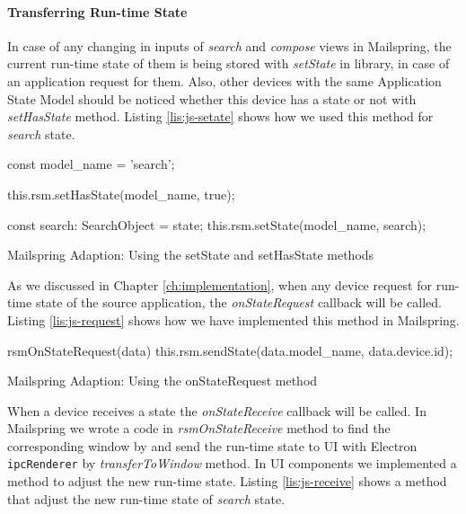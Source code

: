 \paragraph{Transferring Run-time State}
In case of any changing in inputs of \textit{search} and \textit{compose} views in Mailspring, the current run-time state of them is being stored with \textit{setState} in library, in case of an application request for them. Also, other devices with the same Application State Model should be noticed whether this device has a state or not with \textit{setHasState} method. Listing \ref{lis:js-setate} shows how we used this method for \textit{search} state.

\FloatBarrier
\begin{code}
\begin{js2}
const model_name = 'search';

this.rsm.setHasState(model_name, true);

const search: SearchObject = state;
this.rsm.setState(model_name, search);
\end{js2}
\caption{Mailspring Adaption: Using the setState and setHasState methods}
\label{lis:js-setate}
\end{code}
\FloatBarrier


As we discussed in Chapter \ref{ch:implementation}, when any device request for run-time state of the source application, the \textit{onStateRequest} callback will be called. Listing \ref{lis:js-request} shows how we have implemented this method in Mailspring. 
  
\FloatBarrier
\begin{code}
\begin{js2}
rsmOnStateRequest(data) {
   this.rsm.sendState(data.model_name, data.device.id);
}
\end{js2}
\caption{Mailspring Adaption: Using the onStateRequest method}
\label{lis:js-request}
\end{code}
\FloatBarrier

When a device receives a state the \textit{onStateReceive} callback will be called. In Mailspring we wrote a code in \textit{rsmOnStateReceive} method to find the corresponding window by and send the run-time state to UI with Electron \lstinline[basicstyle=\ttfamily]{ipcRenderer} by \textit{transferToWindow} method. In UI components we implemented a method to adjust the new run-time state. Listing \ref{lis:js-receive} shows a method that adjust the new run-time state of \textit{search} state.

